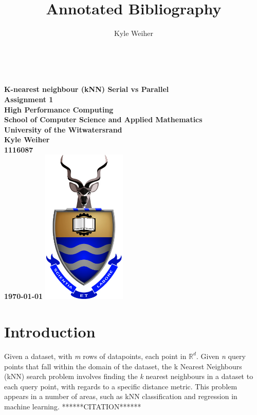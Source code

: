 \documentclass[a4paper,twoside,11pt]{report}
\title{Annotated Bibliography}
\author{Kyle Weiher}
\begin{document}
	\onecolumn
	\thispagestyle{empty}
	
	
	\setcounter{page}{0}
	\ 
	\begin{center}
		
		{
			\Large \bf \sc K-nearest neighbour (kNN) Serial vs Parallel\\
			\large Assignment 1\\[20pt]
			\large High Performance Computing\\[20pt]
			\large School of Computer Science and Applied Mathematics\\
			\large University of the Witwatersrand\\[20pt]
			\normalsize
			Kyle Weiher\\
			1116087\\[20pt]
			\today
		}
		\vfill
		\includegraphics[width=4cm]{images/wits}
		\vfill
		
		\vfill
	\end{center}
\vfill
\newpage
\thispagestyle{plain}

\section*{Introduction}
Given a dataset, with \textit{m} rows of datapoints, each point in $\mathbb{R}^d$. Given \textit{n} query points that fall within the domain of the dataset, the k Nearest Neighbours (kNN) search problem involves finding the \textit{k} nearest neighbours in a dataset to each query point, with regards to a specific distance metric. This problem appears in a number of areas, such as kNN classification and regression in machine learning. ******CITATION******
\end{document}
